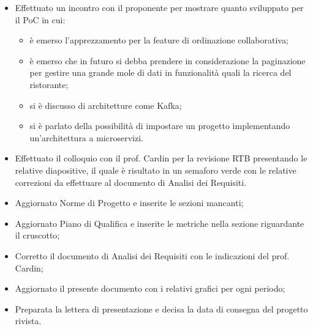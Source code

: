 \begin{itemize}
    \item Effettuato un incontro con il proponente per mostrare quanto sviluppato per il PoC in cui:
    \begin{itemize}
        \item è emerso l'apprezzamento per la feature di ordinazione collaborativa;
        \item è emerso che in futuro si debba prendere in considerazione la paginazione per gestire una grande mole di dati in funzionalità quali la ricerca del ristorante;
        \item si è discusso di architetture come Kafka;
        \item si è parlato della possibilità di impostare un progetto implementando un'architettura a microservizi.
    \end{itemize}
    \item Effettuato il colloquio con il prof. Cardin per la revisione RTB presentando le relative diapositive, il quale è risultato in un semaforo verde con le relative correzioni da effettuare al documento di Analisi dei Requisiti.
    \item Aggiornato Norme di Progetto e inserite le sezioni mancanti;
    \item Aggiornato Piano di Qualifica e inserite le metriche nella sezione riguardante il cruscotto;
    \item Corretto il documento di Analisi dei Requisiti con le indicazioni del prof. Cardin;
    \item Aggiornato il presente documento con i relativi grafici per ogni periodo;
    \item Preparata la lettera di presentazione e decisa la data di consegna del progetto rivista.
\end{itemize}
